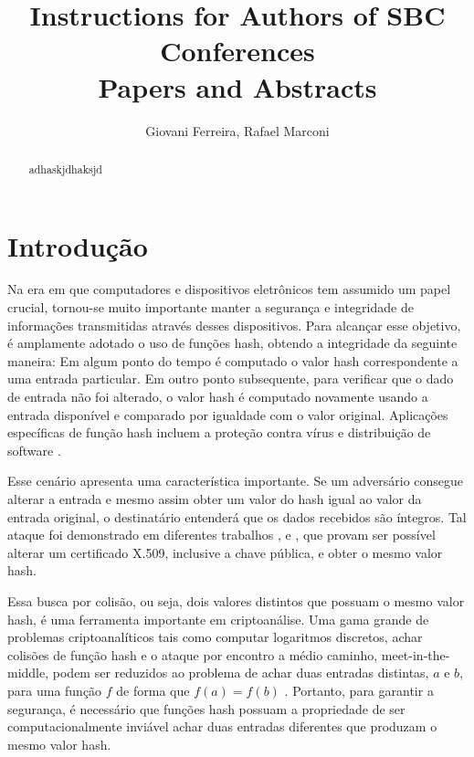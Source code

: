 \documentclass[12pt]{article}
\title{Instructions for Authors of SBC Conferences\\ Papers and Abstracts}
\author{Giovani Ferreira\inst{1}, Rafael Marconi\inst{1} }
\begin{document}
\maketitle

\begin{abstract}
adhaskjdhaksjd \cite{tanenbaum2002distributed}
\end{abstract}

\section{Introdução}

Na era em que computadores e dispositivos eletrônicos tem assumido um papel crucial, tornou-se muito importante manter
a segurança e integridade de informações transmitidas através desses dispositivos. Para alcançar esse objetivo, é
amplamente adotado o uso de funções hash, obtendo a integridade da seguinte maneira: Em algum ponto do tempo é computado
o valor hash correspondente a uma entrada particular. Em outro ponto subsequente, para verificar que o dado de 
entrada não foi alterado, o valor hash é computado novamente usando a entrada disponível e comparado por igualdade 
com o valor original. Aplicações específicas de função hash incluem a proteção contra vírus e distribuição 
de software \cite{menezes1996handbook}.

Esse cenário apresenta uma característica importante. Se um adversário consegue alterar a entrada e mesmo assim obter 
um valor do hash igual ao valor da entrada original, o destinatário entenderá que os dados recebidos são íntegros. Tal 
ataque foi demonstrado em diferentes trabalhos \cite{lenstra2005colliding}, \cite{stevens2007chosen} e
\cite{lenstra2005possibility}, que provam ser possível alterar um certificado X.509, inclusive a chave pública, e obter o 
mesmo valor hash.

Essa busca por colisão, ou seja, dois valores distintos que possuam o mesmo valor hash, é uma ferramenta importante em 
criptoanálise. Uma gama grande de problemas criptoanalíticos tais como computar logaritmos discretos, achar colisões de 
função hash e o ataque por encontro a médio caminho, meet-in-the-middle, podem ser reduzidos ao problema de achar duas 
entradas distintas, \(a\) e \(b\), para uma função \(f\) de forma que \(f(a) = f(b)\) \cite{van1999parallel}. Portanto, 
para garantir a segurança, é necessário que funções hash possuam a propriedade de ser computacionalmente inviável achar 
duas entradas diferentes que produzam o mesmo valor hash.
\end{document}
